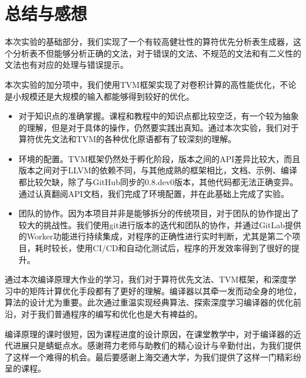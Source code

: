 \section{总结与感想}

本次实验的基础部分，我们实现了一个有较高健壮性的算符优先分析表生成器，这个分析表不但能够分析正确的文法，对于错误的文法、不规范的文法和有二义性的文法也有对应的处理与错误提示。

本次实验的加分项中，我们使用TVM框架实现了对卷积计算的高性能优化，不论是小规模还是大规模的输入都能够得到较好的优化。

\begin{itemize}
    \item 对于知识点的准确掌握。课程和教程中的知识点都比较空泛，有一个较为抽象的理解，但是对于具体的操作，仍然要实践出真知。通过本次实验，我们对于算符优先文法和TVM的各种优化原语都有了较深刻的理解。
    \item 环境的配置。TVM框架仍然处于孵化阶段，版本之间的API差异比较大，而且版本之间对于LLVM的依赖不同，与其他成熟的框架相比，文档、示例、编译都比较欠缺，除了与GitHub同步的0.8.dev0版本，其他代码都无法正确变异。通过认真翻阅API文档，我们完成了环境配置，并在此基础上完成了实验。
    \item 团队的协作。因为本项目并非是能够拆分的传统项目，对于团队的协作提出了较大的挑战性。我们使用git进行版本的迭代和团队的协作，并通过GitLab提供的Worker功能进行持续集成，对程序的正确性进行实时判断，尤其是第二个项目，耗时较长，使用CI/CD和自动化测试后，程序的开发效率得到了很好的提升。
\end{itemize}

通过本次编译原理大作业的学习，我们对于算符优先文法、TVM框架，和深度学习中的矩阵计算优化手段都有了更好的理解。编译器以其牵一发而动全身的地位，算法的设计尤为重要。此次通过重温实现经典算法、探索深度学习编译器的优化前沿，对于我们普通程序的编写和优化也是大有裨益的。

编译原理的课时很短，因为课程进度的设计原因，在课堂教学中，对于编译器的近代进展只是蜻蜓点水。感谢蒋力老师与助教们的精心设计与辛勤付出，为我们提供了这样一个难得的机会。最后要感谢上海交通大学，为我们提供了这样一门精彩纷呈的课程。
